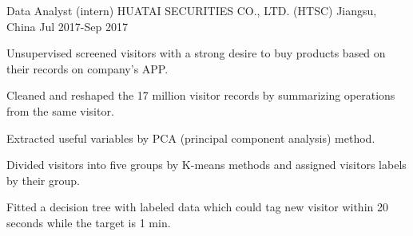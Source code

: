\begin{cventries}
  \cventry
    {Data Analyst (intern)} %
    {HUATAI SECURITIES CO., LTD. (HTSC)} %
    {Jiangsu, China} %
    {Jul 2017-Sep 2017} %
    {
      \begin{cvitems} %
        \item {Unsupervised screened visitors with a strong desire to buy products based on their records on company’s APP.}
        \item {Cleaned and reshaped the 17 million visitor records by summarizing operations from the same visitor.}
        \item {Extracted useful variables by PCA (principal component analysis) method.}
        \item {Divided visitors into five groups by K-means methods and assigned visitors labels by their group.}
        \item {Fitted a decision tree with labeled data which could tag new visitor within 20 seconds while the target is 1 min.}
      \end{cvitems}
    }

\end{cventries}

